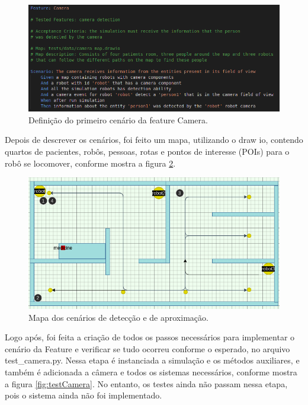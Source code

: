 \begin{figure}
\centering
\includegraphics[width=\textwidth]{imagens/cameraFeature.png}
\caption{Definição do primeiro cenário da feature Camera.} 
\label{fig:cameraFeat}
\end{figure}

Depois de descrever os cenários, foi feito um mapa, utilizando o draw io, contendo quartos de pacientes, robôs, pessoas, rotas e pontos de interesse (POIs) para o robô se locomover, conforme mostra a figura \ref{fig:mapaApprox}.

\begin{figure}
\centering
\includegraphics[width=\textwidth]{imagens/mapaApprox.png}
\caption{Mapa dos cenários de detecção e de aproximação.} 
\label{fig:mapaApprox}
\end{figure}

Logo após, foi feita a criação de todos os passos necessários para implementar o cenário da Feature e verificar se tudo ocorreu conforme o esperado, no arquivo test\_camera.py. Nessa etapa é instanciada a simulação e os métodos auxiliares, e também é adicionada a câmera e todos os sistemas necessários, conforme mostra a figura \ref{fig:testCamera}. No entanto, os testes ainda não passam nessa etapa, pois o sistema ainda não foi implementado.

